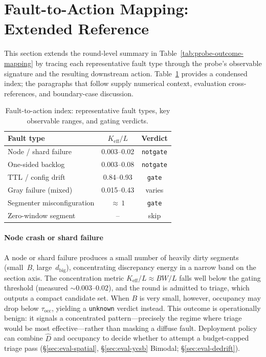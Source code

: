 \section{Fault-to-Action Mapping: Extended Reference}
\label{sec:appendix-fault-mapping}

This section extends the round-level summary in
Table~\ref{tab:probe-outcome-mapping} by tracing each
representative fault type through the probe's observable
signature and the resulting downstream action.
Table~\ref{tab:fault-shape-mapping-full} provides a condensed
index; the paragraphs that follow supply numerical context,
evaluation cross-references, and boundary-case discussion.

\begin{table}[!htbp]
\caption{Fault-to-action index: representative fault types,
key observable ranges, and gating verdicts.}
\label{tab:fault-shape-mapping-full}
\centering
\small
\setlength{\tabcolsep}{4pt}
\begin{tabular}{@{}lcc@{}}
\toprule
Fault type & $K_{\text{eff}}/L$ & Verdict \\
\midrule
Node / shard failure     & 0.003--0.02 & \texttt{notgate} \\
One-sided backlog        & 0.003--0.08 & \texttt{notgate} \\
TTL / config drift       & 0.84--0.93  & \texttt{gate} \\
Gray failure (mixed)     & 0.015--0.43 & varies \\
Segmenter misconfiguration & ${\approx}\,1$ & \texttt{gate} \\
Zero-window segment      & --           & skip \\
\bottomrule
\end{tabular}
\end{table}

\paragraph{Node crash or shard failure}
A node or shard failure produces a small number of heavily
dirty segments (small~$B$, large~$d_{\text{big}}$),
concentrating discrepancy energy in a narrow band on the
section axis.  The concentration metric
$K_{\text{eff}}/L \approx BW/L$ falls well below the gating
threshold (measured ${\sim}0.003$--$0.02$), and the round is
admitted to triage, which outputs a compact candidate set.
When $B$ is very small, however, occupancy may drop below
$\tau_{\text{occ}}$, yielding a \texttt{unknown} verdict
instead.  This outcome is operationally benign: it signals a
concentrated pattern---precisely the regime where triage would
be most effective---rather than masking a diffuse fault.
Deployment policy can combine $\hat{D}$ and occupancy to
decide whether to attempt a budget-capped triage pass
(\S\ref{sec:eval-spatial}, \S\ref{sec:eval-ycsb} Bimodal;
\S\ref{sec:eval-dedrift}).

